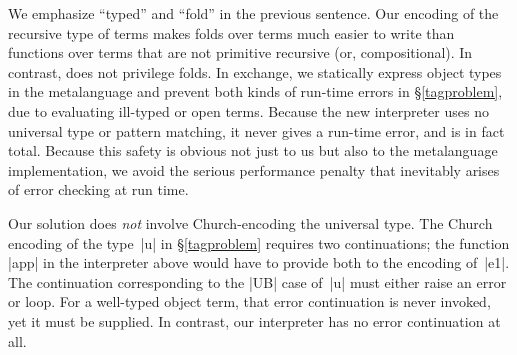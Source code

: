 We emphasize ``typed'' and ``fold'' in the previous sentence.
Our encoding of the recursive type of terms \citep{bohm-automatic}
makes folds over terms much easier to write than functions over
terms that are not primitive recursive (or, compositional).
In contrast, \citet{JFP-Mogensen} does not privilege folds.
In exchange, we statically express object types in the metalanguage
and prevent both kinds of run-time errors in
\S\ref{tagproblem}, due to evaluating ill-typed or open terms.
Because the new interpreter
uses no universal type or pattern matching, it never gives a
run-time error, and is in fact total.  Because this safety is obvious
not just to us but also to the metalanguage implementation, we avoid
the serious performance penalty \citep{WalidICFP02}
that inevitably arises \citep{Gluck-jones-optimality}
of error checking at run time.

Our solution does \emph{not} involve Church-encoding the
universal type. The Church encoding of the type~|u| in \S\ref{tagproblem}
requires two continuations; the function |app| in the interpreter above would
have to provide both to the encoding of~|e1|. The continuation
corresponding to the |UB| case of~|u| must either raise an error or
loop. For a well-typed object term, that error continuation is never
invoked, yet it must be supplied. In contrast, our interpreter has no error
continuation at all.

